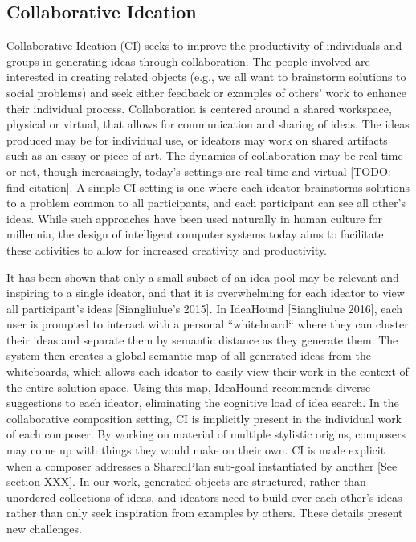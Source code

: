 \documentclass[final,authoryear,5p,times,twocolumn]{elsarticle}
\begin{document}
\subsection{Collaborative Ideation}
Collaborative Ideation (CI) seeks to improve the productivity of individuals and groups in generating ideas through collaboration. The people involved are interested in creating related objects (e.g., we all want to brainstorm solutions to social problems) and seek either feedback or examples of others' work to enhance their individual process. Collaboration is centered around a shared workspace, physical or virtual, that allows for communication and sharing of ideas. The ideas produced may be for individual use, or ideators may work on shared artifacts such as an essay or piece of art. The dynamics of collaboration may be real-time or not, though increasingly, today's settings are real-time and virtual [TODO: find citation]. A simple CI setting is one where each ideator brainstorms solutions to a problem common to all participants, and each participant can see all other's ideas. While such approaches have been used naturally in human culture for millennia, the design of intelligent computer systems today aims to facilitate these activities to allow for increased creativity and productivity. 

It has been shown that only a small subset of an idea pool may be relevant and inspiring to a single ideator, and that it is overwhelming for each ideator to view all participant's ideas [Siangliulue's 2015]. In IdeaHound [Siangliulue 2016], each user is prompted to interact with a personal ``whiteboard`` where they can cluster their ideas and separate them by semantic distance as they generate them. The system then creates a global semantic map of all generated ideas from the whiteboards, which allows each ideator to easily view their work in the context of the entire solution space. Using this map, IdeaHound recommends diverse suggestions to each ideator, eliminating the cognitive load of idea search. In the collaborative composition setting, CI is implicitly present in the individual work of each composer. By working on material of multiple stylistic origins, composers may come up with things they would make on their own. CI is made explicit when a composer addresses a SharedPlan sub-goal instantiated by another [See section XXX]. In our work, generated objects are structured, rather than unordered collections of ideas, and ideators need to build over each other's ideas rather than only seek inspiration from examples by others. These details present new challenges.
\end{document}
